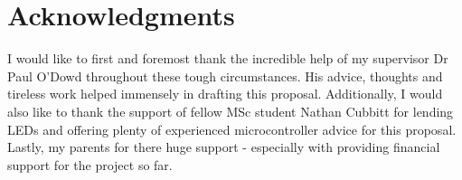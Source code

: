 \documentclass{sigchi}
\begin{document}
\newpage

 
\section{Acknowledgments}

I would like to first and foremost thank the incredible help of my supervisor Dr Paul O'Dowd throughout these tough circumstances. His advice, thoughts and tireless work helped immensely in drafting this proposal. Additionally, I would also like to thank the support of fellow MSc student Nathan Cubbitt for lending LEDs and offering plenty of experienced microcontroller advice for this proposal. Lastly, my parents for there huge support - especially with providing financial support for the project so far. 


\balance{}



\end{document}
